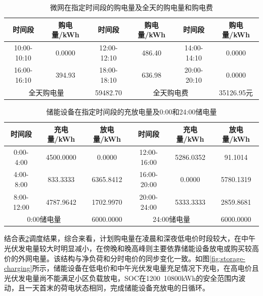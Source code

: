 \documentclass{cumcm2026}
\begin{document}
\begin{table}[H]

\caption{微网在指定时间段的购电量及全天的购电量和购电费}
\label{tab:q1-result}
\begin{tabular}{@{}cccccc@{}}
\toprule
\textbf{时间段} & \textbf{购电量/kWh} & \textbf{时间段} & \textbf{购电量/kWh} & \textbf{时间段} & \textbf{购电量/kWh} \\ \midrule
10:00-10:10  & 0.0000           & 12:00-12:10  & 486.40         & 14:00-14:10  & 0.0000           \\
16:00-16:10  & 394.93         & 18:00-18:10  & 636.98         & 20:00-20:10  & 0.0000           \\
\multicolumn{2}{c}{全天购电量}       & 59482.70   & \multicolumn{2}{c}{全天购电费}       & 35126.95元      \\ \bottomrule
\end{tabular}
\end{table}

\begin{table}[htbp]
\caption{储能设备在指定时间段的充放电量及0:00和24:00储电量}
\label{tab:q1-storage}
\begin{tabular}{@{}cccccc@{}}
\toprule
\textbf{时间段} & \textbf{充电量/kWh} & \textbf{放电量/kWh} & \textbf{时间段} & \textbf{充电量/kWh} & \textbf{放电量/kWh} \\ \midrule
0:00-4:00    & 4500.0000        & 0.0000           & 12:00-16:00  & 5286.0352        & 91.1014          \\
4:00-8:00    & 833.3333         & 6365.8412        & 16:00-20:00  & 0.0000           & 5780.1319        \\
8:00-12:00   & 4787.9642        & 1702.9970        & 20:00-24:00  & 5333.3333        & 2859.8681        \\
\multicolumn{2}{c}{0:00储电量}     & 6000.0000        & \multicolumn{2}{c}{24:00储电量}    & 6000.0000        \\ \bottomrule
\end{tabular}
\end{table}


结合表\ref{tab:q1-storage}调度结果，综合来看，计划购电量在凌晨和深夜低电价时段较大，在中午光伏发电量较大时明显减小，在傍晚和晚高峰则主要依靠储能设备放电或购买较高价的外网电量。该结构与净负荷和分时电价的同步变化一致。如图\ref{fig:storage-charging}所示，储能设备在低电价和中午光伏发电量充足情况下充电，在高电价且光伏发电量尚不能满足小区负载放电，SOC在1200~10800kWh的安全范围内波动，且一天首末的荷电状态相同，完成储能设备充放电的日循环。
\end{document}
